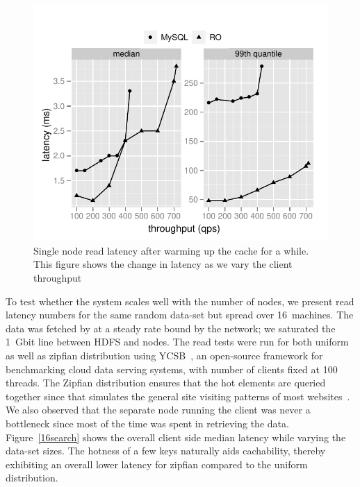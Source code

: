 \begin{figure}
  \centering
    \includegraphics[scale=0.55]{images/mysql_vs_read.pdf}
  \caption{Single node read latency after warming up the cache for a while. This figure shows the change in latency as we vary the client throughput}
  \label{mysql:search}
\end{figure}

To test whether the system scales well with the number of nodes, we
present read latency numbers for the same random data-set but spread
over 16~machines. The data was fetched by \projectname{} at a steady
rate bound by the network; we saturated the 1~Gbit line between HDFS
and \projectname{} nodes. The read tests were run for both uniform as well as
zipfian distribution using YCSB~\cite{ycsb}, an open-source framework 
for benchmarking cloud data serving systems, with number of clients fixed
at 100 threads. The Zipfian distribution ensures that the hot elements are 
queried together since that simulates the general site visiting patterns 
of most websites~\cite{zipf}. We also observed that the separate node
running the client was never a bottleneck since most of the time was
spent in retrieving the data.
Figure~\ref{16search} shows the overall client side median latency while varying 
the data-set sizes. The hotness of a few keys naturally aids cachability, 
thereby exhibiting an overall lower latency for zipfian compared to 
the uniform distribution. 

